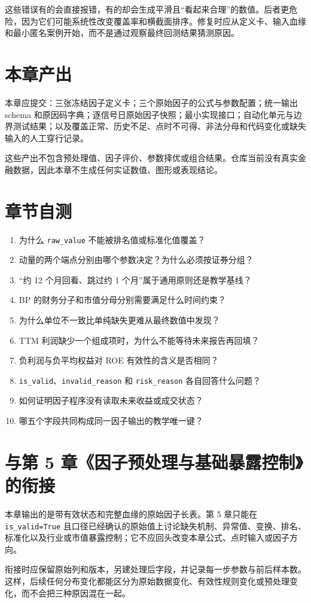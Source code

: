 这些错误有的会直接报错，有的却会生成平滑且“看起来合理”的数值。后者更危险，因为它们可能系统性改变覆盖率和横截面排序。修复时应从定义卡、输入血缘和最小匿名案例开始，而不是通过观察最终回测结果猜测原因。

\section{本章产出}

\begin{outputbox}
本章应提交：三张冻结因子定义卡；三个原始因子的公式与参数配置；统一输出 schema 和原因码字典；逐信号日原始因子快照；最小实现接口；自动化单元与边界测试结果；以及覆盖正常、历史不足、点时不可得、非法分母和代码变化或缺失输入的人工穿行记录。
\end{outputbox}

这些产出不包含预处理值、因子评价、参数择优或组合结果。仓库当前没有真实金融数据，因此本章不生成任何实证数值、图形或表现结论。

\section{章节自测}

\begin{quizbox}
\begin{enumerate}
  \item 为什么 \texttt{raw\_value} 不能被排名值或标准化值覆盖？
  \item 动量的两个端点分别由哪个参数决定？为什么必须按证券分组？
  \item “约 12 个月回看、跳过约 1 个月”属于通用原则还是教学基线？
  \item BP 的财务分子和市值分母分别需要满足什么时间约束？
  \item 为什么单位不一致比单纯缺失更难从最终数值中发现？
  \item TTM 利润缺少一个组成项时，为什么不能等待未来报告再回填？
  \item 负利润与负平均权益对 ROE 有效性的含义是否相同？
  \item \texttt{is\_valid}、\texttt{invalid\_reason} 和
  \texttt{risk\_reason} 各自回答什么问题？
  \item 如何证明因子程序没有读取未来收益或成交状态？
  \item 哪五个字段共同构成同一因子输出的教学唯一键？
\end{enumerate}
\end{quizbox}

\section{与第 5 章《因子预处理与基础暴露控制》的衔接}

本章输出的是带有效状态和完整血缘的原始因子长表。第 5 章只能在
\texttt{is\_valid=True} 且口径已经确认的原始值上讨论缺失机制、异常值、变换、排名、标准化以及行业或市值暴露控制；它不应回头改变本章公式、点时输入或因子方向。

衔接时应保留原始列和版本，另建处理后字段，并记录每一步参数与前后样本数。这样，后续任何分布变化都能区分为原始数据变化、有效性规则变化或预处理变化，而不会把三种原因混在一起。
